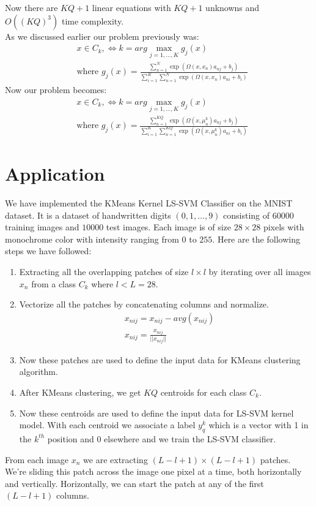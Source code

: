 \documentclass[conference]{IEEEtran}
\begin{document}
    Now there are $KQ+1$ linear equations with $KQ+1$ unknowns and $O((KQ)^3)$ time complexity. \\
    As we discussed earlier our problem previously was:
    \begin{align*}
        & x \in C_{k}, \Leftrightarrow k= arg \max_{j=1,\ldots,K} g_{j}(x) \\
        & \text{where } g_{j}(x) = \frac{\sum_{n=1}^{N}\exp(\Omega(x,x_{n})a_{nj} + b_{j})}{\sum_{i=1}^{K} \sum_{n=1}^{N}\exp(\Omega(x,x_{n})a_{ni} + b_{i})}
    \end{align*}
    Now our problem becomes:
    \begin{align*}
        & x \in C_{k}, \Leftrightarrow k= arg \max_{j=1,\ldots,K} g_{j}(x) \\
        & \text{where } g_{j}(x) = \frac{\sum_{n=1}^{KQ}\exp(\Omega(x,\mu_{n}^{k})a_{nj} + b_{j})}{\sum_{i=1}^{K} \sum_{n=1}^{KQ}\exp(\Omega(x,\mu_{n}^{k})a_{ni} + b_{i})}
    \end{align*}


    \section{Application}\label{sec:application}
    We have implemented the KMeans Kernel LS-SVM Classifier on the MNIST dataset.
    It is a dataset of handwritten digits $(0,1,\ldots,9)$ consisting of $60000$ training images and $10000$ test images.
    Each image is of size $28 \times 28$ pixels with monochrome color
    with intensity ranging from $0$ to $255$.
    Here are the following steps we have followed:
    \begin{enumerate}
        \item Extracting all the overlapping patches of size $l \times l$ by iterating over all images $x_{n}$ from a
        class $C_{k}$ where $l<L=28$.
        \item Vectorize all the patches by concatenating columns and normalize.
        \begin{align*}
            & x_{nij} = x_{nij} - avg(x_{nij}) \\
            & x_{nij} = \frac{x_{nij}}{||x_{nij}||}
        \end{align*}
        \item Now these patches are used to define the input data for KMeans clustering algorithm.
        \item After KMeans clustering, we get $KQ$ centroids for each class $C_{k}$.
        \item Now these centroids are used to define the input data for LS-SVM kernel model.
        With each centroid we associate a label $y_{q}^{k}$ which is a vector with 1 in the $k^{th}$ position and
        $0$ elsewhere and we train the LS-SVM classifier.
    \end{enumerate}
    From each image $x_{n}$ we are extracting $(L - l +1) \times (L - l + 1)$ patches.
    We're sliding this patch across the image one pixel at a time, both horizontally and vertically.
    Horizontally, we can start the patch at any of the first $(L - l + 1)$ columns.
\end{document}
